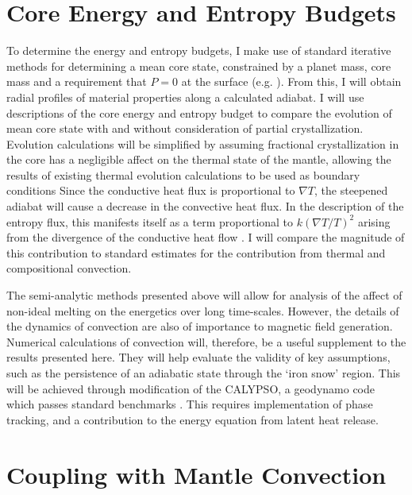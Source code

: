 \section{Core Energy and Entropy Budgets}

To determine the energy and entropy budgets, I make use of standard iterative
methods for determining a mean core state, constrained by a planet mass, core
mass and a requirement that $P=0$ at the surface (e.g. \cite{lister95}). From
this, I will obtain radial profiles of material properties along a calculated
adiabat.  I will use descriptions of the core energy and entropy budget
\cite{gubbins79,lister95,lister03} to compare the evolution of mean core state
with and without consideration of partial crystallization. Evolution
calculations will be simplified by assuming fractional crystallization in the
core has a negligible affect on the thermal state of the mantle, allowing the
results of existing thermal evolution calculations \cite{hauck04,breuer07} to
be used as boundary conditions Since the conductive heat flux is proportional
to $\nabla T$, the steepened adiabat will cause a decrease in the convective
heat flux. In the description of the entropy flux, this manifests itself as a
term proportional to $k\left(\nabla T / T \right)^2$ arising from the
divergence of the conductive heat flow \cite{lister03}. I will compare the
magnitude of this contribution to standard estimates for the contribution from
thermal and compositional convection.

The semi-analytic methods presented above will allow for analysis of the
affect of non-ideal melting on the energetics over long time-scales. However,
the details of the dynamics of convection are also of importance to magnetic field
generation. Numerical calculations of convection will, therefore, be a useful
supplement to the results presented here. They will help evaluate the validity of
key assumptions, such as the persistence of an adiabatic state through the
`iron snow' region. This will be achieved through modification of the CALYPSO,
a geodynamo code which passes standard benchmarks \cite{christensen01}. This
requires implementation of phase tracking, and a contribution to the energy
equation from latent heat release. 



\section{Coupling with Mantle Convection}

